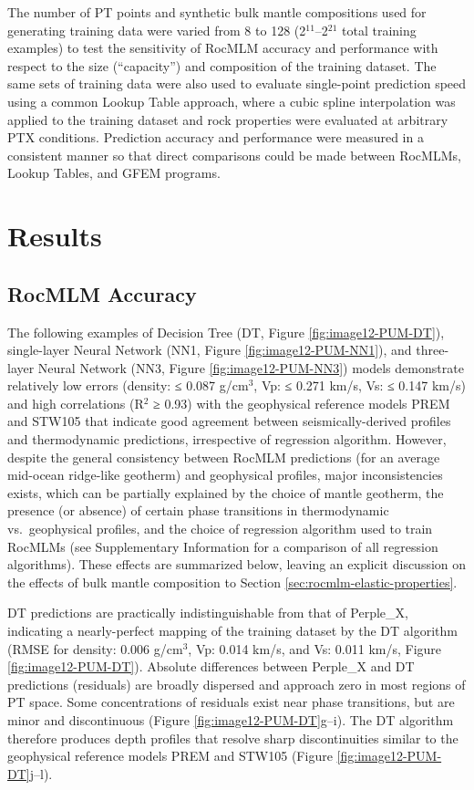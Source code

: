 \documentclass[draft,linenumbers]{agujournal2018}
\begin{document}
The number of PT points and synthetic bulk mantle compositions used for generating training data were varied from 8 to 128 (2\(^{11}\)--2\(^{21}\) total training examples) to test the sensitivity of RocMLM accuracy and performance with respect to the size (``capacity'') and composition of the training dataset. The same sets of training data were also used to evaluate single-point prediction speed using a common Lookup Table approach, where a cubic spline interpolation was applied to the training dataset and rock properties were evaluated at arbitrary PTX conditions. Prediction accuracy and performance were measured in a consistent manner so that direct comparisons could be made between RocMLMs, Lookup Tables, and GFEM programs.

\section{Results}\label{sec:results}

\subsection{RocMLM Accuracy}\label{sec:rocmlms-accuracy}

The following examples of Decision Tree (DT, Figure \ref{fig:image12-PUM-DT}), single-layer Neural Network (NN1, Figure \ref{fig:image12-PUM-NN1}), and three-layer Neural Network (NN3, Figure \ref{fig:image12-PUM-NN3}) models demonstrate relatively low errors (density: ≤ 0.087 g/cm\(^3\), Vp: ≤ 0.271 km/s, Vs: ≤ 0.147 km/s) and high correlations (R\(^2\) ≥ 0.93) with the geophysical reference models PREM and STW105 that indicate good agreement between seismically-derived profiles and thermodynamic predictions, irrespective of regression algorithm. However, despite the general consistency between RocMLM predictions (for an average mid-ocean ridge-like geotherm) and geophysical profiles, major inconsistencies exists, which can be partially explained by the choice of mantle geotherm, the presence (or absence) of certain phase transitions in thermodynamic vs.~geophysical profiles, and the choice of regression algorithm used to train RocMLMs (see Supplementary Information for a comparison of all regression algorithms). These effects are summarized below, leaving an explicit discussion on the effects of bulk mantle composition to Section \ref{sec:rocmlm-elastic-properties}.

DT predictions are practically indistinguishable from that of Perple\_X, indicating a nearly-perfect mapping of the training dataset by the DT algorithm (RMSE for density: 0.006 g/cm\(^3\), Vp: 0.014 km/s, and Vs: 0.011 km/s, Figure \ref{fig:image12-PUM-DT}). Absolute differences between Perple\_X and DT predictions (residuals) are broadly dispersed and approach zero in most regions of PT space. Some concentrations of residuals exist near phase transitions, but are minor and discontinuous (Figure \ref{fig:image12-PUM-DT}g--i). The DT algorithm therefore produces depth profiles that resolve sharp discontinuities similar to the geophysical reference models PREM and STW105 (Figure \ref{fig:image12-PUM-DT}j--l).
\end{document}
